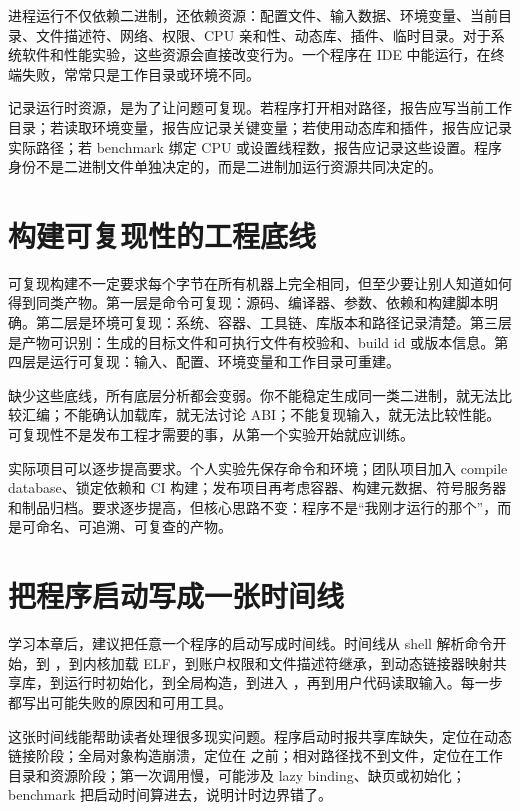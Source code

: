进程运行不仅依赖二进制，还依赖资源：配置文件、输入数据、环境变量、当前目录、文件描述符、网络、权限、CPU 亲和性、动态库、插件、临时目录。对于系统软件和性能实验，这些资源会直接改变行为。一个程序在 IDE 中能运行，在终端失败，常常只是工作目录或环境不同。

记录运行时资源，是为了让问题可复现。若程序打开相对路径，报告应写当前工作目录；若读取环境变量，报告应记录关键变量；若使用动态库和插件，报告应记录实际路径；若 benchmark 绑定 CPU 或设置线程数，报告应记录这些设置。程序身份不是二进制文件单独决定的，而是二进制加运行资源共同决定的。

\section{构建可复现性的工程底线}

可复现构建不一定要求每个字节在所有机器上完全相同，但至少要让别人知道如何得到同类产物。第一层是命令可复现：源码、编译器、参数、依赖和构建脚本明确。第二层是环境可复现：系统、容器、工具链、库版本和路径记录清楚。第三层是产物可识别：生成的目标文件和可执行文件有校验和、build id 或版本信息。第四层是运行可复现：输入、配置、环境变量和工作目录可重建。

缺少这些底线，所有底层分析都会变弱。你不能稳定生成同一类二进制，就无法比较汇编；不能确认加载库，就无法讨论 ABI；不能复现输入，就无法比较性能。可复现性不是发布工程才需要的事，从第一个实验开始就应训练。

实际项目可以逐步提高要求。个人实验先保存命令和环境；团队项目加入 compile database、锁定依赖和 CI 构建；发布项目再考虑容器、构建元数据、符号服务器和制品归档。要求逐步提高，但核心思路不变：程序不是“我刚才运行的那个”，而是可命名、可追溯、可复查的产物。

\section{把程序启动写成一张时间线}

学习本章后，建议把任意一个程序的启动写成时间线。时间线从 shell 解析命令开始，到 ，到内核加载 ELF，到账户权限和文件描述符继承，到动态链接器映射共享库，到运行时初始化，到全局构造，到进入 ，再到用户代码读取输入。每一步都写出可能失败的原因和可用工具。

这张时间线能帮助读者处理很多现实问题。程序启动时报共享库缺失，定位在动态链接阶段；全局对象构造崩溃，定位在  之前；相对路径找不到文件，定位在工作目录和资源阶段；第一次调用慢，可能涉及 lazy binding、缺页或初始化；benchmark 把启动时间算进去，说明计时边界错了。

